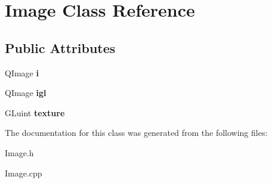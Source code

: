 \hypertarget{class_image}{\section{\-Image \-Class \-Reference}
\label{class_image}
}
\subsection*{\-Public \-Attributes}
\begin{DoxyCompactItemize}
\item 
\hypertarget{class_image_a090be627da2f913d63074cb6db7ded61}{\-Q\-Image {\bfseries i}}\label{class_image_a090be627da2f913d63074cb6db7ded61}

\item 
\hypertarget{class_image_a52d0c0e0bccec7cd4be2d8faf8311cda}{\-Q\-Image {\bfseries igl}}\label{class_image_a52d0c0e0bccec7cd4be2d8faf8311cda}

\item 
\hypertarget{class_image_afd2e917da00fbcb1e3e901437897e883}{\-G\-Luint {\bfseries texture}}\label{class_image_afd2e917da00fbcb1e3e901437897e883}

\end{DoxyCompactItemize}


\-The documentation for this class was generated from the following files\-:\begin{DoxyCompactItemize}
\item 
\-Image.\-h\item 
\-Image.\-cpp\end{DoxyCompactItemize}
